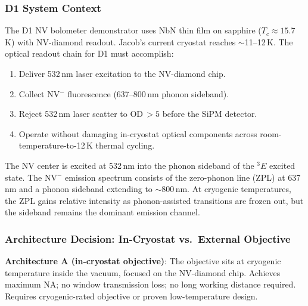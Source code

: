 \subsubsection{D1 System Context}

The D1 NV bolometer demonstrator uses NbN thin film on sapphire ($T_c \approx
15.7$\,K) with NV-diamond readout. Jacob's current cryostat reaches
$\sim$11--12\,K. The optical readout chain for D1 must accomplish:
\begin{enumerate}
  \item Deliver 532\,nm laser excitation to the NV-diamond chip.
  \item Collect NV$^-$ fluorescence (637--800\,nm phonon sideband).
  \item Reject 532\,nm laser scatter to OD\,$> 5$ before the SiPM detector.
  \item Operate without damaging in-cryostat optical components across
    room-temperature-to-12\,K thermal cycling.
\end{enumerate}

The NV center is excited at 532\,nm into the phonon sideband of the $^3E$
excited state.\cite{Rondin2014} %
The NV$^-$ emission spectrum consists of the zero-phonon line (ZPL) at
637\,nm and a phonon sideband extending to $\sim$800\,nm.\cite{Doherty2013}
At cryogenic temperatures, the ZPL gains relative intensity as
phonon-assisted transitions are frozen out, but the sideband remains the
dominant emission channel.\cite{Doherty2013}

\subsubsection{Architecture Decision: In-Cryostat vs.\ External Objective}


\textbf{Architecture A (in-cryostat objective)}: The objective sits at
cryogenic temperature inside the vacuum, focused on the NV-diamond chip.
Achieves maximum NA; no window transmission loss; no long working distance
required. Requires cryogenic-rated objective or proven low-temperature design.

